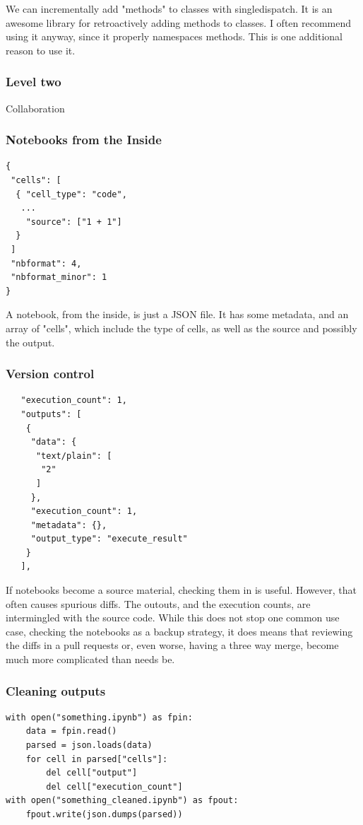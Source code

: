 We can incrementally add "methods" to classes with singledispatch.
It is an awesome library for retroactively adding methods to classes.
I often recommend using it anyway,
since it properly namespaces methods.
This is one additional reason to use it.

\begin{frame}
\frametitle{Level two}

Collaboration
\end{frame}

\begin{frame}[fragile]
\frametitle{Notebooks from the Inside}

\begin{lstlisting}
{
 "cells": [
  { "cell_type": "code",
   ...
    "source": ["1 + 1"]
  }
 ]
 "nbformat": 4,
 "nbformat_minor": 1
}
\end{lstlisting}

\end{frame}

A notebook,
from the inside,
is just a JSON file.
It has some metadata,
and an array of "cells",
which include the type of cells,
as well as the source
and possibly the output.


\begin{frame}[fragile]
\frametitle{Version control}

\begin{lstlisting}
   "execution_count": 1,
   "outputs": [
    {
     "data": {
      "text/plain": [
       "2"
      ]
     },
     "execution_count": 1,
     "metadata": {},
     "output_type": "execute_result"
    }
   ],
\end{lstlisting}

\end{frame}

If notebooks become a source material,
checking them in is useful.
However,
that often causes spurious diffs.
The outouts,
and the execution counts,
are intermingled with the source code.
While this does not stop one common use case,
checking the notebooks as a backup strategy,
it does means that reviewing the diffs
in a pull requests or,
even worse,
having a three way merge,
become much more complicated than needs be.

\begin{frame}[fragile]
\frametitle{Cleaning outputs}

\begin{lstlisting}
with open("something.ipynb") as fpin:
    data = fpin.read()
    parsed = json.loads(data)
    for cell in parsed["cells"]:
        del cell["output"]
        del cell["execution_count"]
with open("something_cleaned.ipynb") as fpout:
    fpout.write(json.dumps(parsed))
\end{lstlisting}

\end{frame}


